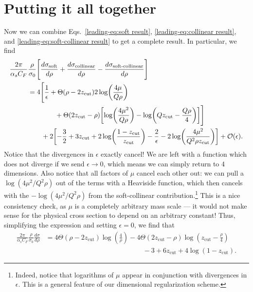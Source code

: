 \documentclass[../thesis.tex]{subfiles}
\providecommand{\zcut}{z_\mathrm{{cut}}}
\providecommand{\cO}{\mathcal{O}}
\begin{document}
\section{Putting it all together}
	Now we can combine Eqs.~\ref{leading-eq:soft result}, \ref{leading-eq:collinear result}, and \ref{leading-eq:soft-collinear result} to get a complete result. In particular, we find
	\begin{equation}
	\begin{aligned}
		\frac{2\pi}{\alpha_s C_F}&\frac{\rho}{\sigma_0}\Bigg[\frac{d\sigma_{\text{soft}}}{d\rho} + \frac{d\sigma_{\text{collinear}}}{d\rho} - \frac{d\sigma_{\text{soft-collinear}}}{d\rho}\Bigg] \\
		&= 4 \Bigg[\frac{1}{\epsilon} + \Theta(\rho - 2\zcut)2\log(\frac{4\mu}{Q\rho}) \\
			&\qquad\qquad+ \Theta(2\zcut - \rho)\qty[\log(\frac{4\mu^2}{Q \rho}) - \log(Q \zcut - \frac{Q\rho}{4})]\Bigg] \\
			&\qquad + 2\qty[-\frac{3}{2} + 3 \zcut + 2 \log(\frac{1-\zcut}{\zcut}) - \frac{2}{\epsilon} - 2\log(\frac{4\mu^2}{Q^2 \rho \zcut})] + \cO(\epsilon).
	\end{aligned}
	\end{equation}
	Notice that the divergences in $\epsilon$ exactly cancel! We are left with a function which does not diverge if we send $\epsilon \to 0$, which means we can simply return to 4 dimensions. Also notice that all factors of $\mu$ cancel each other out: we can pull a $\log(4\mu^2/Q^2\rho)$ out of the terms with a Heaviside function, which then cancels with the $-\log(4\mu^2/Q^2\rho)$ from the soft-collinear contribution.\footnote{Indeed, notice that logarithms of $\mu$ appear in conjunction with divergences in $\epsilon$. This is a general feature of our dimensional regularization scheme.} This is a nice consistency check, as $\mu$ is a completely arbitrary mass scale --- it would not make sense for the physical cross section to depend on an arbitrary constant! Thus, simplifying the expression and setting $\epsilon = 0$, we find that
	\begin{equation}\label{leading-eq:fixed order result}
	\boxed{
	\begin{aligned}
		\frac{2\pi}{\alpha_s C_F}\frac{\rho}{\sigma_0}\frac{d\sigma}{d\rho} &= 4\Theta(\rho - 2\zcut)\log(\frac{4}{\rho}) - 4\Theta(2\zcut - \rho)\log(\zcut - \frac{\rho}{4}) \\
		&\hspace{6cm} - 3 + 6\zcut + 4\log(1-\zcut).
	\end{aligned}
	}
	\end{equation}
\end{document}
